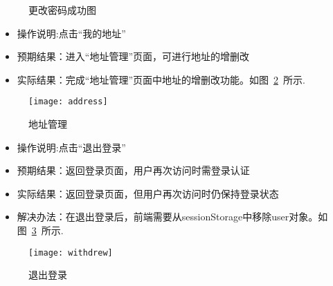\begin{enumerate}
\begin{figure}[htbp]
\begin{minipage}{0.4\textwidth}
                  \caption{更改密码成功图}\label{fig:correctPass}
              \end{minipage}
          \end{figure}
          \begin{itemize}
              \item{操作说明}:点击“我的地址”
              \item {预期结果}：进入“地址管理”页面，可进行地址的增删改
              \item {实际结果}：完成“地址管理”页面中地址的增删改功能。如图~\ref{fig:address}~所示.
          \end{itemize}
          \begin{figure}[htbp]
              \centering
              \texttt{[image: address]}
              \caption{地址管理}\label{fig:address}
          \end{figure}
          \begin{itemize}
              \item{操作说明}:点击“退出登录”
              \item {预期结果}：返回登录页面，用户再次访问时需登录认证
              \item {实际结果}：返回登录页面，但用户再次访问时仍保持登录状态
              \item {解决办法}：在退出登录后，前端需要从sessionStorage中移除user对象。如图~\ref{fig:withdrew}~所示.
          \end{itemize}
          \begin{figure}[htbp]
              \centering
              \texttt{[image: withdrew]}
              \caption{退出登录}\label{fig:withdrew}
          \end{figure}

\end{enumerate}

